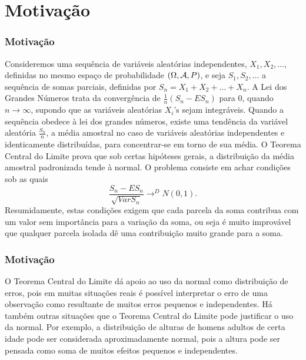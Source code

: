 \section{Motivação}
\begin{frame}
\frametitle{\textbf{Motivação}}
\baselineskip=13pt
\begin{block}{}
	
	
	Consideremos uma sequência de variáveis aleatórias independentes,
	$X_1,X_2,\ldots$, definidas no mesmo espaço de probabilidade
	$(\Omega,{\cal A},P)$, e seja $S_1,S_2,\ldots$ a sequência de somas
	parciais, definidas por $S_n=X_1+X_2+\ldots+X_n$. A Lei dos Grandes
	Números trata da convergência de $\frac{1}{n}(S_n-ES_n)$ para 0,
	quando $n\rightarrow\infty$, supondo que as variáveis aleatórias
	$X_i$'s sejam integráveis. Quando a sequência obedece à lei dos
	grandes números, existe uma tendência da variável aleatória
	$\frac{S_n}{n}$, a média amostral no caso de variáveis aleatórias
	independentes e identicamente distribuídas, para concentrar-se em
	torno de sua média. O Teorema Central do Limite prova que sob certas
	hipóteses gerais, a distribuição da média amostral padronizada tende
	à normal. O problema consiste em achar condições sob as quais
	$$\frac{S_n-ES_n}{\sqrt{Var S_n}}\rightarrow^D N(0,1).$$
	Resumidamente, estas condições exigem que cada parcela da soma
	contribua com um valor sem importância para a variação da soma, ou
	seja é muito improvável que qualquer parcela isolada dê uma
	contribuição muito grande para a soma.
	
\end{block}
\end{frame}

\begin{frame}
\frametitle{\textbf{Motivação}}
\baselineskip=13pt
\begin{block}{}


O Teorema Central do Limite dá apoio ao uso da normal como
distribuição de erros, pois em muitas situações reais é possível
interpretar o erro de uma observação como resultante de muitos erros
pequenos e independentes. Há também outras situações que o Teorema
Central do Limite pode justificar o uso da normal. Por exemplo, a
distribuição de alturas de homens adultos de certa idade pode ser
considerada aproximadamente normal, pois a altura pode ser pensada
como soma de muitos efeitos pequenos e independentes.

\end{block}
\end{frame}

